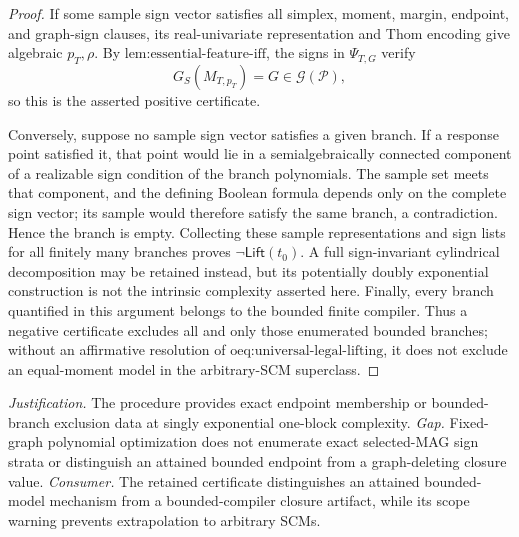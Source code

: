 \documentclass{article}
\begin{document}
\begin{proof}
If some sample sign vector satisfies all simplex, moment, margin, endpoint, and graph-sign clauses, its real-univariate representation and Thom encoding give algebraic \(p_T,\rho\).  By \(\text{lem:essential-feature-iff}\), the signs in \(\Psi_{T,G}\) verify
\[
G_S(M_{T,p_T})=G\in\mathcal G(\mathcal P),
\]
so this is the asserted positive certificate.

Conversely, suppose no sample sign vector satisfies a given branch.  If a response point satisfied it, that point would lie in a semialgebraically connected component of a realizable sign condition of the branch polynomials.  The sample set meets that component, and the defining Boolean formula depends only on the complete sign vector; its sample would therefore satisfy the same branch, a contradiction.  Hence the branch is empty.  Collecting these sample representations and sign lists for all finitely many branches proves \(\neg\mathsf{Lift}(t_0)\).  A full sign-invariant cylindrical decomposition may be retained instead, but its potentially doubly exponential construction is not the intrinsic complexity asserted here.  Finally, every branch quantified in this argument belongs to the bounded finite compiler.  Thus a negative certificate excludes all and only those enumerated bounded branches; without an affirmative resolution of \(\text{oeq:universal-legal-lifting}\), it does not exclude an equal-moment model in the arbitrary-SCM superclass.
\end{proof}
\par\smallskip\noindent \textit{Justification.} The procedure provides exact endpoint membership or bounded-branch exclusion data at singly exponential one-block complexity. \textit{Gap.} Fixed-graph polynomial optimization does not enumerate exact selected-MAG sign strata or distinguish an attained bounded endpoint from a graph-deleting closure value. \textit{Consumer.} The retained certificate distinguishes an attained bounded-model mechanism from a bounded-compiler closure artifact, while its scope warning prevents extrapolation to arbitrary SCMs.
\end{document}
